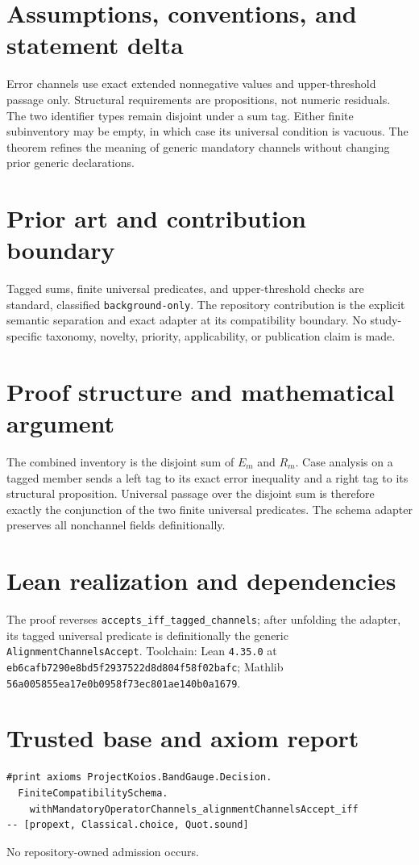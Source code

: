 \documentclass[11pt]{article}
\begin{document}
\section{Assumptions, conventions, and statement delta}
Error channels use exact extended nonnegative values and upper-threshold passage only.  Structural requirements are propositions, not numeric residuals.  The two identifier types remain disjoint under a sum tag.  Either finite subinventory may be empty, in which case its universal condition is vacuous.  The theorem refines the meaning of generic mandatory channels without changing prior generic declarations.

\section{Prior art and contribution boundary}
Tagged sums, finite universal predicates, and upper-threshold checks are standard, classified \texttt{background-only}.  The repository contribution is the explicit semantic separation and exact adapter at its compatibility boundary.  No study-specific taxonomy, novelty, priority, applicability, or publication claim is made.

\section{Proof structure and mathematical argument}
The combined inventory is the disjoint sum of $E_m$ and $R_m$.  Case analysis on a tagged member sends a left tag to its exact error inequality and a right tag to its structural proposition.  Universal passage over the disjoint sum is therefore exactly the conjunction of the two finite universal predicates.  The schema adapter preserves all nonchannel fields definitionally.

\section{Lean realization and dependencies}
The proof reverses \texttt{accepts\_iff\_tagged\_channels}; after unfolding the adapter, its tagged universal predicate is definitionally the generic \texttt{AlignmentChannelsAccept}.  Toolchain: Lean \texttt{4.35.0} at \texttt{eb6cafb7290e8bd5f2937522d8d804f58f02bafc}; Mathlib \texttt{56a005855ea17e0b0958f73ec801ae140b0a1679}.

\section{Trusted base and axiom report}
\begin{verbatim}
#print axioms ProjectKoios.BandGauge.Decision.
  FiniteCompatibilitySchema.
    withMandatoryOperatorChannels_alignmentChannelsAccept_iff
-- [propext, Classical.choice, Quot.sound]
\end{verbatim}
No repository-owned admission occurs.
\end{document}
